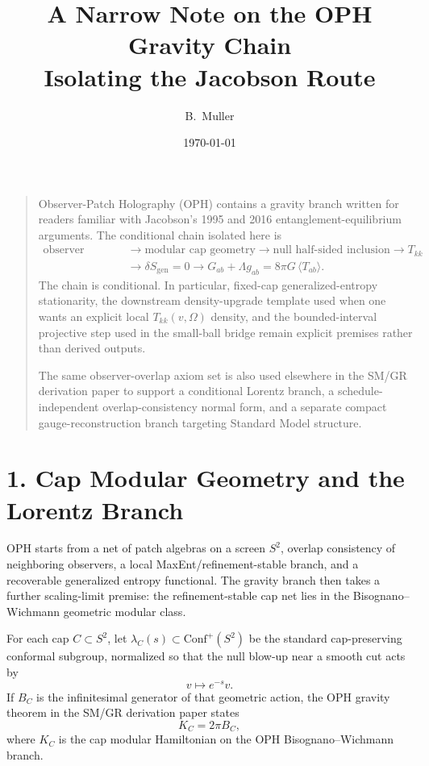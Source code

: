 \documentclass[10pt]{article}
\title{A Narrow Note on the OPH Gravity Chain\\[0.3em]\large Isolating the Jacobson Route}
\author{B.\ Muller}
\date{\today}
\newcommand{\Conf}{\mathrm{Conf}}
\begin{document}
\maketitle

\begin{quote}\small
Observer-Patch Holography (OPH) contains a gravity branch written for readers familiar with Jacobson's 1995 and 2016 entanglement-equilibrium arguments. The conditional chain isolated here is
\[
\begin{aligned}
\text{observer overlap}
&\to \text{modular cap geometry}
\to \text{null half-sided inclusion}
\to T_{kk} \\
&\to \delta S_{\mathrm{gen}}=0
\to G_{ab}+\Lambda g_{ab}=8\pi G\,\langle T_{ab}\rangle.
\end{aligned}
\]
The chain is conditional. In particular, fixed-cap generalized-entropy stationarity, the downstream density-upgrade template used when one wants an explicit local \(T_{kk}(v,\Omega)\) density, and the bounded-interval projective step used in the small-ball bridge remain explicit premises rather than derived outputs.

The same observer-overlap axiom set is also used elsewhere in the SM/GR derivation paper to support a conditional Lorentz branch, a schedule-independent overlap-consistency normal form, and a separate compact gauge-reconstruction branch targeting Standard Model structure.
\end{quote}

\section*{1. Cap Modular Geometry and the Lorentz Branch}

OPH starts from a net of patch algebras on a screen \(S^2\), overlap consistency of neighboring observers, a local MaxEnt/refinement-stable branch, and a recoverable generalized entropy functional. The gravity branch then takes a further scaling-limit premise: the refinement-stable cap net lies in the Bisognano--Wichmann geometric modular class.

For each cap \(C \subset S^2\), let \(\lambda_C(s) \subset \Conf^+(S^2)\) be the standard cap-preserving conformal subgroup, normalized so that the null blow-up near a smooth cut acts by
\[
v \mapsto e^{-s} v.
\]
If \(B_C\) is the infinitesimal generator of that geometric action, the OPH gravity theorem in the SM/GR derivation paper states
\[
K_C = 2\pi B_C,
\]
where \(K_C\) is the cap modular Hamiltonian on the OPH Bisognano--Wichmann branch.
\end{document}
